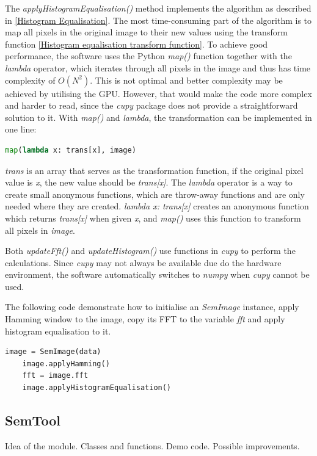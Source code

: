 \documentclass[conference]{IEEEtran}
\begin{document}
The \textit{applyHistogramEqualisation()} method implements the algorithm as described in \ref{Histogram Equalisation}. The most time-consuming part of the algorithm is to map all pixels in the original image to their new values using the transform function \eqref{Histogram equalisation transform function}. To achieve good performance, the software uses the Python \textit{map()} function together with the \textit{lambda} operator, which iterates through all pixels in the image and thus has time complexity of $O(N^2)$. This is not optimal and better complexity may be achieved by utilising the GPU. However, that would make the code more complex and harder to read, since the \textit{cupy} package does not provide a straightforward solution to it. With \textit{map()} and \textit{lambda}, the transformation can be implemented in one line:
\begin{lstlisting}[language=Python]
    map(lambda x: trans[x], image)
\end{lstlisting}
\textit{trans} is an array that serves as the transformation function, if the original pixel value is \textit{x}, the new value should be \textit{trans[x]}. The \textit{lambda} operator is a way to create small anonymous functions, which are throw-away functions and are only needed where they are created. \textit{lambda x: trans[x]} creates an anonymous function which returns \textit{trans[x]} when given \textit{x}, and \textit{map()} uses this function to transform all pixels in \textit{image}.

Both \textit{updateFft()} and \textit{updateHistogram()} use functions in \textit{cupy} to perform the calculations. Since \textit{cupy} may not always be available due do the hardware environment, the software automatically switches to \textit{numpy} when \textit{cupy} cannot be used.

The following code demonstrate how to initialise an \textit{SemImage} instance, apply Hamming window to the image, copy its FFT to the variable \textit{fft} and apply histogram equalisation to it.
\begin{lstlisting}[language=Python]
    image = SemImage(data)
    image.applyHamming()
    fft = image.fft
    image.applyHistogramEqualisation()
\end{lstlisting}

\subsection{SemTool}
Idea of the module.
Classes and functions.
Demo code.
Possible improvements.
\end{document}
